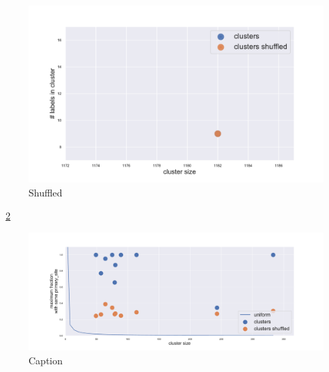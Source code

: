 \begin{figure}[htb!]
\begin{minipage}{0.45\textwidth}
    \end{minipage}
    \hspace{3mm}
    \begin{minipage}{0.45\textwidth}
    \includegraphics[width=0.9\linewidth]{pictures/topic/gtex/oversigma_10tissue/shuffledcluster_shuffle_label_size_l4_primary_site.pdf}
    \end{minipage}
\label{topic/gtex/oversigma_10tissue/shuffledcluster_shuffle_label_size_l*}
\caption{Shuffled}
\end{figure}
~\ref{fig:topic/gtex/oversigma_10tissue/shuffledclusterhomosize_l3_primary_site}
\begin{figure}[htb!]
    \centering
    \includegraphics[width=0.9\linewidth]{pictures/topic/gtex/oversigma_10tissue/shuffledclusterhomosize_l3_primary_site.pdf}
    \caption{Caption}
    \label{fig:topic/gtex/oversigma_10tissue/shuffledclusterhomosize_l3_primary_site}
\end{figure}


